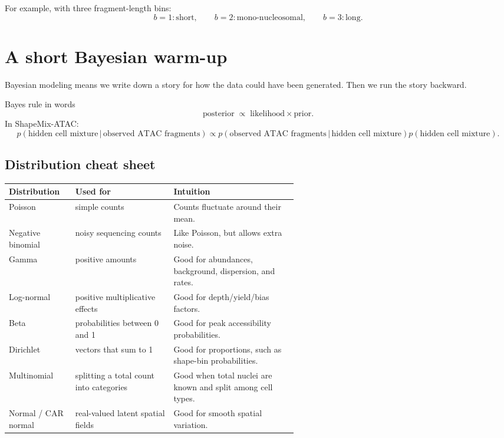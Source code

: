 \documentclass[11pt]{article}
\newcommand{\given}{\,|\,}
\begin{document}
For example, with three fragment-length bins:
\[
 b=1: \text{short}, \qquad b=2: \text{mono-nucleosomal}, \qquad b=3: \text{long}.
\]

\section{A short Bayesian warm-up}

Bayesian modeling means we write down a story for how the data could have been generated.  Then we run the story backward.

\begin{mathbox}{Bayes rule in words}
\[
\text{posterior} \; \propto \; \text{likelihood} \times \text{prior}.
\]
In ShapeMix-ATAC:
\[
 p(\text{hidden cell mixture} \given \text{observed ATAC fragments})
 \propto
 p(\text{observed ATAC fragments} \given \text{hidden cell mixture})
 p(\text{hidden cell mixture}).
\]
\end{mathbox}

\subsection{Distribution cheat sheet}

\begin{center}
\begin{tabularx}{\linewidth}{L{0.23\linewidth}L{0.34\linewidth}X}
\toprule
Distribution & Used for & Intuition \\
\midrule
Poisson & simple counts & Counts fluctuate around their mean. \\
Negative binomial & noisy sequencing counts & Like Poisson, but allows extra noise. \\
Gamma & positive amounts & Good for abundances, background, dispersion, and rates. \\
Log-normal & positive multiplicative effects & Good for depth/yield/bias factors. \\
Beta & probabilities between 0 and 1 & Good for peak accessibility probabilities. \\
Dirichlet & vectors that sum to 1 & Good for proportions, such as shape-bin probabilities. \\
Multinomial & splitting a total count into categories & Good when total nuclei are known and split among cell types. \\
Normal / CAR normal & real-valued latent spatial fields & Good for smooth spatial variation. \\
\bottomrule
\end{tabularx}
\end{center}
\end{document}
